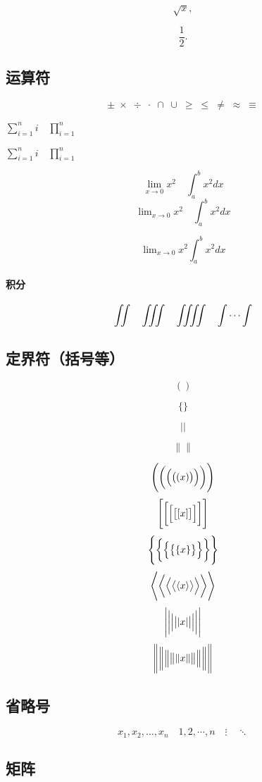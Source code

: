 \documentclass[UTF8]{ctexart}
\begin{document}
\[ \sqrt{x}, \]

\[ \frac{1}{2}. \]

\subsection{ 运算符}

\[ \pm\; \times \; \div\; \cdot\; \cap\; \cup\;
\geq\; \leq\; \neq\; \approx \; \equiv \]

$ \sum_{i=1}^n i\quad \prod_{i=1}^n $

$ \sum\limits  _{i=1}^n i
\quad \prod\limits _{i=1}^n $


\[ \lim_{x\to0}x^2 \quad \int_a^b x^2 dx \]
\[ \lim\nolimits _{x\to0}x^2\quad \int\nolimits_a^b x^2 dx \]

\[ \lim\nolimits _{x\to0}x^2                              \int\nolimits_a^b x^2 dx \]

\paragraph{积分}

\[ \iint\quad \iiint\quad \iiiint\quad \idotsint \]

\subsection{ 定界符（括号等）}
\[ ( ) \]


\[ \{ \} \]

\[ \lvert \rvert \]

\[ \lVert \rVert \]

\[ \Biggl(\biggl(\Bigl(\bigl((x)\bigr)\Bigr)\biggr)\Biggr) \]
\[ \Biggl[\biggl[\Bigl[\bigl[[x]\bigr]\Bigr]\biggr]\Biggr] \]
\[ \Biggl \{\biggl \{\Bigl \{\bigl \{\{x\}\bigr \}\Bigr \}\biggr \}\Biggr\} \]
\[ \Biggl\langle\biggl\langle\Bigl\langle\bigl\langle\langle x
\rangle\bigr\rangle\Bigr\rangle\biggr\rangle\Biggr\rangle \]
\[ \Biggl\lvert\biggl\lvert\Bigl\lvert\bigl\lvert\lvert x
\rvert\bigr\rvert\Bigr\rvert\biggr\rvert\Biggr\rvert \]
\[ \Biggl\lVert\biggl\lVert\Bigl\lVert\bigl\lVert\lVert x
\rVert\bigr\rVert\Bigr\rVert\biggr\rVert\Biggr\rVert \]

\subsection{省略号}
\[ x_1,x_2,\dots ,x_n\quad 1,2,\cdots ,n\quad
\vdots\quad \ddots \]

\subsection{矩阵}
\end{document}
